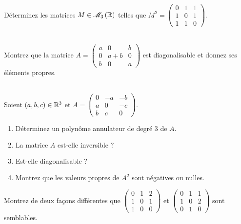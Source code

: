 \begin{exo}
Déterminez les matrices \(M\in\M{3}[\R]\) telles que \(M^2=\begin{pmatrix}
0 & 1 & 1 \\
1 & 0 & 1 \\
1 & 1 & 0
\end{pmatrix}\).
\end{exo}



\begin{exo}~\\
Montrez que la matrice \(A=\begin{pmatrix}
a & 0 & b \\
0 & a+b & 0 \\
b & 0 & a
\end{pmatrix}\) est diagonalisable et donnez ses éléments propres.
\end{exo}



\begin{exo}~\\
Soient \(\left(a,b,c\right)\in\mathbb{R}^3\) et \(A=\begin{pmatrix}
0 & -a & -b \\
a & 0 & -c \\
b & c & 0
\end{pmatrix}\).

\begin{enumerate}
    \item Déterminez un polynôme annulateur de degré \(3\) de \(A\). \\
    \item La matrice \(A\) est-elle inversible ? \\
    \item Est-elle diagonalisable ? \\
    \item Montrez que les valeurs propres de \(A^2\) sont négatives ou nulles.
\end{enumerate}
\end{exo}



\begin{exo}
Montrez de deux façons différentes que \(\begin{pmatrix}
0 & 1 & 2 \\
1 & 0 & 1 \\
1 & 0 & 0
\end{pmatrix}\) et \(\begin{pmatrix}
0 & 1 & 1 \\
1 & 0 & 2 \\
0 & 1 & 0
\end{pmatrix}\) sont semblables.
\end{exo}



